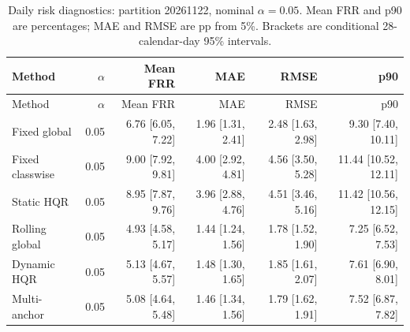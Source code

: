 \begingroup\small\setlength{\tabcolsep}{3pt}
\begin{longtable}{lrrrrr}
\caption{Daily risk diagnostics: partition 20261122, nominal $\alpha=0.05$. Mean FRR and p90 are percentages; MAE and RMSE are pp from 5\%. Brackets are conditional 28-calendar-day 95\% intervals.}\label{tab:final-risk-1-0}\\
\toprule
Method & $\alpha$ & Mean FRR & MAE & RMSE & p90\\
\midrule
\endfirsthead
\toprule
Method & $\alpha$ & Mean FRR & MAE & RMSE & p90\\
\midrule
\endhead
Fixed global & 0.05 & 6.76 [6.05, 7.22] & 1.96 [1.31, 2.41] & 2.48 [1.63, 2.98] & 9.30 [7.40, 10.11]\\
Fixed classwise & 0.05 & 9.00 [7.92, 9.81] & 4.00 [2.92, 4.81] & 4.56 [3.50, 5.28] & 11.44 [10.52, 12.11]\\
Static HQR & 0.05 & 8.95 [7.87, 9.76] & 3.96 [2.88, 4.76] & 4.51 [3.46, 5.16] & 11.42 [10.56, 12.15]\\
Rolling global & 0.05 & 4.93 [4.58, 5.17] & 1.44 [1.24, 1.56] & 1.78 [1.52, 1.90] & 7.25 [6.52, 7.53]\\
Dynamic HQR & 0.05 & 5.13 [4.67, 5.57] & 1.48 [1.30, 1.65] & 1.85 [1.61, 2.07] & 7.61 [6.90, 8.01]\\
Multi-anchor & 0.05 & 5.08 [4.64, 5.48] & 1.46 [1.34, 1.56] & 1.79 [1.62, 1.91] & 7.52 [6.87, 7.82]\\
\bottomrule
\end{longtable}
\endgroup
